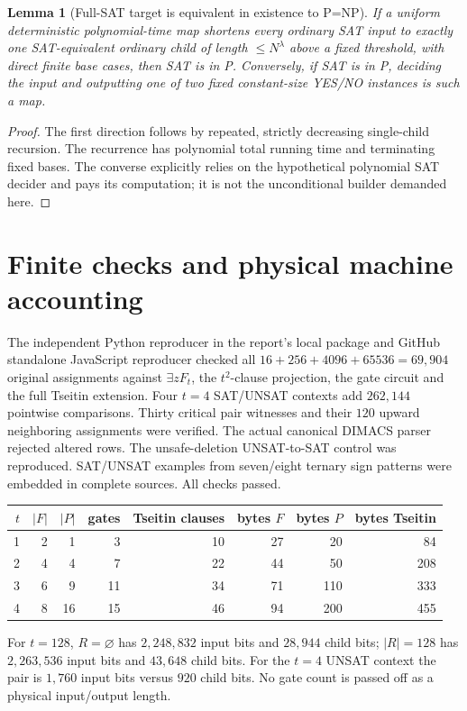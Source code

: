 \documentclass[11pt]{article}
\newtheorem{lemma}[theorem]{Lemma}
\begin{document}
\begin{lemma}[Full-SAT target is equivalent in existence to P=NP]
If a uniform deterministic polynomial-time map shortens
every ordinary SAT input to exactly one SAT-equivalent
ordinary child of length $\le N^\lambda$ above a fixed
threshold, with direct finite base cases, then SAT is in P.
Conversely, if SAT is in P, deciding the input and outputting
one of two fixed constant-size YES/NO instances is such a map.
\end{lemma}
\begin{proof}
The first direction follows by repeated, strictly
decreasing single-child recursion. The recurrence has
polynomial total running time and terminating fixed bases.
The converse explicitly relies on the hypothetical
polynomial SAT decider and pays its computation; it is
not the unconditional builder demanded here.
\end{proof}

\section{Finite checks and physical machine accounting}
The independent Python reproducer in the report's local package
and GitHub standalone JavaScript reproducer checked all
$16+256+4096+65536=69,904$ original assignments
against $\exists z F_t$, the $t^2$-clause projection,
the gate circuit and the full Tseitin extension.
Four $t=4$ SAT/UNSAT contexts add $262,144$ pointwise
comparisons. Thirty critical pair witnesses and their
$120$ upward neighboring assignments were verified.
The actual canonical DIMACS parser rejected altered rows.
The unsafe-deletion UNSAT-to-SAT control was reproduced.
SAT/UNSAT examples from seven/eight ternary sign patterns
were embedded in complete sources. All checks passed.

\begin{center}\small
\begin{tabular}{rrrrrrrr}
\toprule
$t$ & $|F|$ & $|P|$ & gates & Tseitin clauses &
bytes $F$ & bytes $P$ & bytes Tseitin\\
\midrule
1&2&1&3&10&27&20&84\\
2&4&4&7&22&44&50&208\\
3&6&9&11&34&71&110&333\\
4&8&16&15&46&94&200&455\\
\bottomrule
\end{tabular}
\end{center}
For $t=128$, $R=\varnothing$ has $2,248,832$ input bits
and $28,944$ child bits; $|R|=128$ has $2,263,536$ input
bits and $43,648$ child bits. For the $t=4$ UNSAT context
the pair is $1,760$ input bits versus $920$ child bits.
No gate count is passed off as a physical input/output length.
\end{document}
